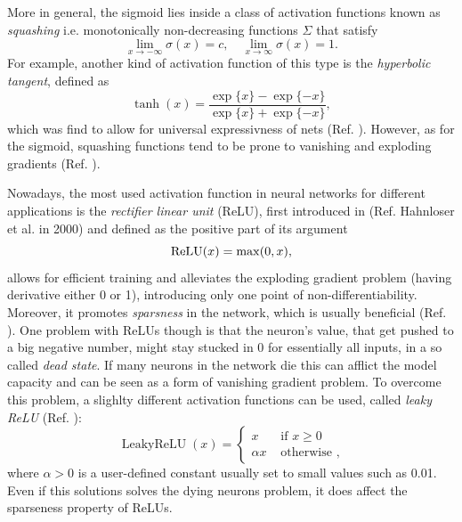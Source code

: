 \documentclass[LaM,binding=0.6cm]{./packages/sapthesis/sapthesis}
\begin{document}
            More in general, the sigmoid lies inside a class of activation functions known as \textit{squashing} i.e. monotonically non-decreasing functions $\varSigma$
            that satisfy
            \begin{equation}
                \lim_{x \to - \infty} \sigma(x) = c, \quad 
                \lim_{x \to \infty} \sigma(x) = 1.
            \end{equation}
            For example, another kind of activation function of this type is the \textit{hyperbolic tangent}, defined as
            \begin{equation}
                \tanh (x)=\frac{\exp \{x\}-\exp \{-x\}}{\exp \{x\}+\exp \{-x\}},
            \end{equation}
            which was find to allow for universal expressivness of nets (Ref. ). However, as for the sigmoid, squashing functions tend to be prone to vanishing 
            and exploding gradients (Ref. ).

            Nowadays, the most used activation function in neural networks for different applications is the \textit{rectifier linear unit} (ReLU),
            first introduced in (Ref. Hahnloser et al. in 2000) and defined as the positive part of its argument
            \begin{equation}
                \textnormal{ReLU}(x) = \max(0, x),
            \end{equation}
            allows for efficient training and alleviates the exploding gradient problem (having derivative either 0 or 1), introducing only one point of
            non-differentiability. Moreover, it promotes \textit{sparsness} in the network, which is usually beneficial (Ref. ). One problem with ReLUs though 
            is that the neuron's value, that get pushed to a big negative number, might stay stucked in 0 for essentially all inputs, in a so called \textit{dead state}.
            If many neurons in the network die this can afflict the model capacity and can be seen as a form of vanishing gradient problem. To overcome this problem,
            a slighlty different activation functions can be used, called \textit{leaky ReLU} (Ref. ):
            \begin{equation}
                \operatorname{Leaky ReLU}(x)=\left\{\begin{array}{ll}
                    x & \text { if } x \geq 0 \\
                    \alpha x & \text { otherwise },
                    \end{array}\right.
            \end{equation}
            where $\alpha > 0$ is a user-defined constant usually set to small values such as 0.01. Even if this solutions solves the dying neurons problem, it does
            affect the sparseness property of ReLUs.
            
\end{document}
